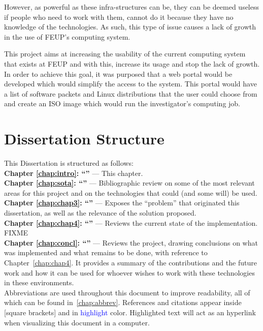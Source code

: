 However, as powerful as these infra-structures can be, they can be deemed useless if people who need to work with them, cannot do it because they have no knowledge of the technologies. As such, this type of issue causes a lack of growth in the use of FEUP's computing system.

This project aims at increasing the usability of the current computing system that exists at FEUP and with this, increase its usage and stop the lack of growth. In order to achieve this goal, it was purposed that a web portal would be developed which would simplify the access to the system. This portal would have a list of software packets and Linux distributions that the user could choose from and create an ISO image which would run the investigator's computing job.

\section{Dissertation Structure} \label{sec:structure}

This Dissertation is structured as follows:\\
\textbf{Chapter \ref{chap:intro}: ``'' } --- This chapter.\\
\textbf{Chapter \ref{chap:sota}: ``'' } --- Bibliographic review on some of the most relevant areas for this project and on the technologies that could (and some will) be used.\\
\textbf{Chapter \ref{chap:chap3}: ``'' } --- Exposes the ``problem'' that originated this dissertation, as well as the relevance of the solution proposed.\\
\textbf{Chapter \ref{chap:chap4}: ``'' } --- Reviews the current state of the implementation. FIXME\\
\textbf{Chapter \ref{chap:concl}: ``'' } --- Reviews the project, drawing conclusions on what was implemented and what remains to be done, with reference to Chapter~\ref{chap:chap4}. It provides a summary of the contributions and the future work and how it can be used for whoever wishes to work with these technologies in these environments.\\

Abbreviations are used throughout this document to improve readability, all of which can be found in~\ref{chap:abbrev}. References and citations appear inside [square brackets] and in \textcolor{blue}{highlight} color. Highlighted text will act as an hyperlink when visualizing this document in a computer.


